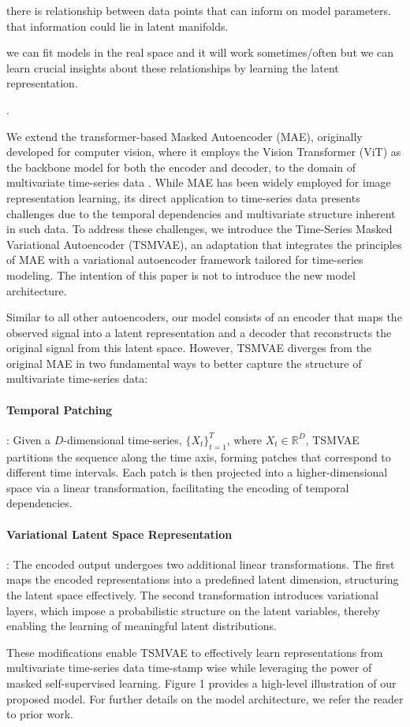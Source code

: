 \documentclass[12pt]{article} %
\newcommand{\para}[1]{\vspace*{-4.5mm}\paragraph{#1}}
\newcommand{\blue}[1]{{\color{magenta}{#1}}}
\begin{document}
there is relationship between data points that can inform on model parameters. that information could lie in latent manifolds. 

we can fit models in the real space and it will work sometimes/often but we can learn crucial insights about these relationships by learning the latent representation.

\blue{simulation based inference}.

We extend the transformer-based Masked Autoencoder (MAE), originally developed for computer vision, where it employs the Vision Transformer (ViT) as the backbone model for both the encoder and decoder, to the domain of multivariate time-series data \citep{dosovitskiy2020image, he2022masked}. While MAE has been widely employed for image representation learning, its direct application to time-series data presents challenges due to the temporal dependencies and multivariate structure inherent in such data. To address these challenges, we introduce the Time-Series Masked Variational Autoencoder (TSMVAE), an adaptation that integrates the principles of MAE with a variational autoencoder framework tailored for time-series modeling. The intention of this paper is not to introduce the new model architecture.

Similar to all other autoencoders, our model consists of an encoder that maps the observed signal into a latent representation and a decoder that reconstructs the original signal from this latent space. However, TSMVAE diverges from the original MAE in two fundamental ways to better capture the structure of multivariate time-series data:

\para{Temporal Patching}: Given a $D$-dimensional time-series, $\{X_t\}_{t=1}^{T}$, where $X_t \in \mathbb{R}^D$, TSMVAE partitions the sequence along the time axis, forming patches that correspond to different time intervals. Each patch is then projected into a higher-dimensional space via a linear transformation, facilitating the encoding of temporal dependencies.

\para{Variational Latent Space Representation}: The encoded output undergoes two additional linear transformations. The first maps the encoded representations into a predefined latent dimension, structuring the latent space effectively. The second transformation introduces variational layers, which impose a probabilistic structure on the latent variables, thereby enabling the learning of meaningful latent distributions. 

These modifications enable TSMVAE to effectively learn representations from multivariate time-series data time-stamp wise while leveraging the power of masked self-supervised learning. Figure 1 provides a high-level illustration of our proposed model. For further details on the model architecture, we refer the reader to prior work.
\end{document}
